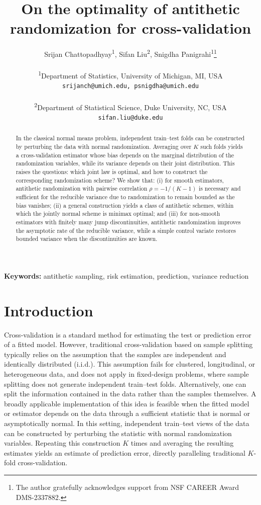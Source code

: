 \documentclass[12pt]{article}
\title{On the optimality of antithetic randomization for cross-validation}
\author{
  Srijan Chattopadhyay\textsuperscript{1}, 
  Sifan Liu\textsuperscript{2}, 
  Snigdha Panigrahi\textsuperscript{1}\thanks{The author gratefully acknowledges support from NSF CAREER Award DMS-2337882.} \\
  \vspace{0.2cm}\\
  \textsuperscript{1}Department of Statistics, University of Michigan, MI, USA \\
  \texttt{srijanch@umich.edu, psnigdha@umich.edu} \\
  \vspace{0.2cm}\\
  \textsuperscript{2}Department of Statistical Science, Duke University, NC, USA \\
  \texttt{sifan.liu@duke.edu}
}
\date{}
\theoremstyle{general}
\begin{document}
\maketitle


\begin{abstract}
In the classical normal means problem, independent train--test folds can be constructed by perturbing the data with normal randomization. Averaging over $K$ such folds yields a cross-validation estimator whose bias depends on the marginal distribution of the randomization variables, while its variance depends on their joint distribution. This raises the questions: which joint law is optimal, and how to construct the corresponding randomization scheme? We show that: (i) for smooth estimators, antithetic randomization with pairwise correlation $\rho=-1/(K-1)$ is necessary and sufficient for the reducible variance due to randomization to remain bounded as the bias vanishes; (ii) a general construction yields a class of antithetic schemes, within which the jointly normal scheme is minimax optimal; and (iii) for non-smooth estimators with finitely many jump discontinuities, antithetic randomization improves the asymptotic rate of the reducible variance, while a simple control variate restores bounded variance when the discontinuities are known.
\end{abstract}

\textbf{Keywords:} antithetic sampling, risk estimation, prediction, variance reduction


\section{Introduction}
\label{sec: introduction}

Cross-validation is a standard method for estimating the test or prediction error of a fitted model. 
However, traditional cross-validation based on sample splitting typically relies on the assumption that the samples are independent and identically distributed (i.i.d.).
This assumption fails for clustered, longitudinal, or heterogeneous data, and does not apply in fixed-design problems, where sample splitting does not generate independent train--test folds.
Alternatively, one can split the information contained in the data rather than the samples themselves.
A broadly applicable implementation of this idea is feasible when the fitted model or estimator depends on the data through a sufficient statistic that is normal or asymptotically normal.
In this setting, independent train--test views of the data can be constructed by perturbing the statistic with normal randomization variables.
Repeating this construction $K$ times and averaging the resulting estimates yields an estimate of prediction error, directly paralleling traditional $K$-fold cross-validation.
\end{document}
